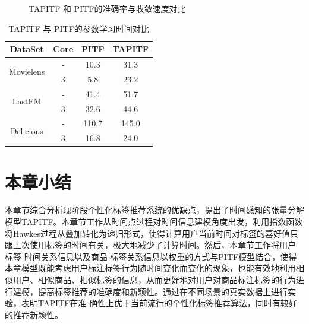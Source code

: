 \begin{figure}
	\hspace{0.8cm}
	\caption{TAPITF 和 PITF的准确率与收敛速度对比}
	\label{fig-wpitf-number}
\end{figure}

\begin{table}
  \centering
  \caption{TAPITF 与 PITF的参数学习时间对比}
  	 \label{tab-wpitf-effiency}
    \begin{tabular}{|c||c|c|c|}
    \hline
    DataSet  & Core  & PITF  & TAPITF \bigstrut\\
    \hline
    \hline
    \multirow{2}[4]{*}{Movielens } & -     & 10.3  & 31.3  \bigstrut\\
\cline{2-4}          & 3     & 5.8   & 23.2  \bigstrut\\
    \hline
    \multirow{2}[4]{*}{LastFM } & -     & 41.4  & 51.7  \bigstrut\\
\cline{2-4}          & 3     & 32.6  & 44.6  \bigstrut\\
    \hline
    \multirow{2}[4]{*}{Delicious } & -     & 110.7  & 145.0  \bigstrut\\
\cline{2-4}          & 3     & 16.8  & 24.0  \bigstrut\\
    \hline
    \end{tabular}%

\end{table}%


\section{本章小结}
\label{sec-wpitf-conclusion}
本章节综合分析现阶段个性化标签推荐系统的优缺点，提出了时间感知的张量分解模型TAPITF。本章节工作从时间点过程对时间信息建模角度出发，利用指数函数将Hawkes过程从叠加转化为递归形式，使得计算用户当前时间对标签的喜好值只跟上次使用标签的时间有关，极大地减少了计算时间。然后，本章节工作将用户-标签-时间关系信息以及商品-标签关系信息以权重的方式与PITF模型结合，使得本章模型既能考虑用户标注标签行为随时间变化而变化的现象，也能有效地利用相似用户、相似商品、相似标签的信息，从而更好地对用户对商品标注标签的行为进行建模，提高标签推荐的准确度和新颖性。通过在不同场景的真实数据上进行实验，表明TAPITF在准 确性上优于当前流行的个性化标签推荐算法，同时有较好的推荐新颖性。

\clearpage
\phantom{s}
\clearpage